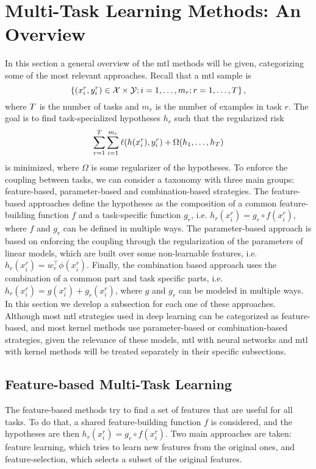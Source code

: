 \section{Multi-Task Learning Methods: An Overview}\label{sec:ch3_overview}
In this section a general overview of the \acrshort{mtl} methods will be given, categorizing some of the most relevant approaches. 
%
Recall that a \acrlong{mtl} sample is
$$ \left\{(x_i^r, y_i^r) \in \mathcal{X} \times \mathcal{Y}; i=1,\ldots, m_r; r=1,\ldots, T\right\},$$
where $T$ is the number of tasks and $m_r$ is the number of examples in task $r$.
The goal is to find task-specialized hypotheses $h_r$ such that the regularized risk 
\begin{equation}
    \nonumber
    \sum_{r=1}^T \sum_{i=1}^{m_r} \ell(h(x_i^r), y_i^r) + \Omega(h_1, \ldots, h_T)
\end{equation}
is minimized, where $\Omega$ is some regularizer of the hypotheses. 
To enforce the coupling between tasks, we can consider a taxonomy with three main groups: feature-based, parameter-based and combination-based strategies. 
The feature-based approaches define the hypotheses as the composition of a common feature-building function $f$ and a task-specific function $g_r$, i.e. $h_r(x_i^r) = g_r \circ f(x_i^r)$, where $f$ and $g_r$ can be defined in multiple ways.
The parameter-based approach is based on enforcing the coupling through the regularization of the parameters of linear models, which are built over some non-learnable features, i.e. $h_r(x_i^r) = w_r^\intercal \phi(x_i^r)$.
Finally, the combination based approach uses the combination of a common part and task specific parts, i.e. $h_r(x_i^r) = g(x_i^r) + g_r(x_i^r)$, where $g$ and $g_r$ can be modeled in multiple ways.
In this section we develop a subsection for each one of these approaches.
%
Although most \acrshort{mtl} strategies used in deep learning can be categorized as feature-based, and most kernel methods use parameter-based or combination-based strategies, given the relevance of these models, \acrshort{mtl} with neural networks and \acrshort{mtl} with kernel methods will be treated separately in their specific subsections. 

\subsection{Feature-based Multi-Task Learning}\label{subsec:featbased_mtl}
The feature-based methods try to find a set of features that are useful for all tasks.
To do that, a shared feature-building function $f$ is considered, and the hypotheses are then $h_r(x_i^r) = g_r \circ f(x_i^r)$.
Two main approaches are taken: feature learning, which tries to learn new features from the original ones, and feature-selection, which selects a subset of the original features.



